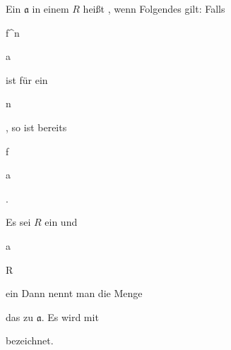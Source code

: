 

{}


{


Ein
${\mathfrak a}$ in einem
$R$ heißt 
 {} {,}
wenn Folgendes gilt: Falls


\mavergleichskette


{\vergleichskette


{ f^n
}


{ \in }{ {\mathfrak a}
}


{  }{
}


{    }{
}


{   }{
}


}
{}{}{}
ist für ein


\mavergleichskette


{\vergleichskette


{ n
}


{ \in }{ \N
}


{  }{
}


{    }{
}


{   }{
}


}
{}{}{,}
so ist bereits


\mavergleichskette


{\vergleichskette


{ f
}


{ \in }{ {\mathfrak a}
}


{  }{
}


{    }{
}


{   }{
}


}
{}{}{.}


}




{ }


{


Es sei $R$ ein
und


\mavergleichskette


{\vergleichskette


{ {\mathfrak a}
}


{ \subseteq }{ R
}


{  }{
}


{    }{
}


{   }{
}


}
{}{}{}
ein
Dann nennt man die Menge


 {  }


das  zu ${\mathfrak a}$. Es wird mit


 bezeichnet.


}


